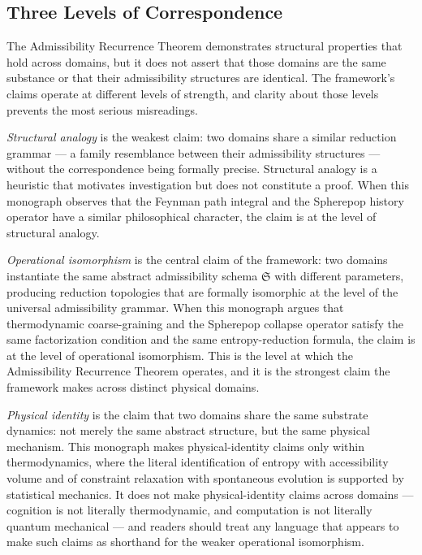 \documentclass[12pt,openany]{book}
\theoremstyle{plain}
\theoremstyle{definition}
\theoremstyle{remark}
\begin{document}
\subsection*{Three Levels of Correspondence}

The Admissibility Recurrence Theorem demonstrates structural properties that hold across domains, but it does not assert that those domains are the same substance or that their admissibility structures are identical. The framework's claims operate at different levels of strength, and clarity about those levels prevents the most serious misreadings.

\emph{Structural analogy} is the weakest claim: two domains share a similar reduction grammar — a family resemblance between their admissibility structures — without the correspondence being formally precise. Structural analogy is a heuristic that motivates investigation but does not constitute a proof. When this monograph observes that the Feynman path integral and the Spherepop history operator have a similar philosophical character, the claim is at the level of structural analogy.

\emph{Operational isomorphism} is the central claim of the framework: two domains instantiate the same abstract admissibility schema $\mathfrak{S}$ with different parameters, producing reduction topologies that are formally isomorphic at the level of the universal admissibility grammar. When this monograph argues that thermodynamic coarse-graining and the Spherepop collapse operator satisfy the same factorization condition and the same entropy-reduction formula, the claim is at the level of operational isomorphism. This is the level at which the Admissibility Recurrence Theorem operates, and it is the strongest claim the framework makes across distinct physical domains.

\emph{Physical identity} is the claim that two domains share the same substrate dynamics: not merely the same abstract structure, but the same physical mechanism. This monograph makes physical-identity claims only within thermodynamics, where the literal identification of entropy with accessibility volume and of constraint relaxation with spontaneous evolution is supported by statistical mechanics. It does not make physical-identity claims across domains — cognition is not literally thermodynamic, and computation is not literally quantum mechanical — and readers should treat any language that appears to make such claims as shorthand for the weaker operational isomorphism.
\end{document}
